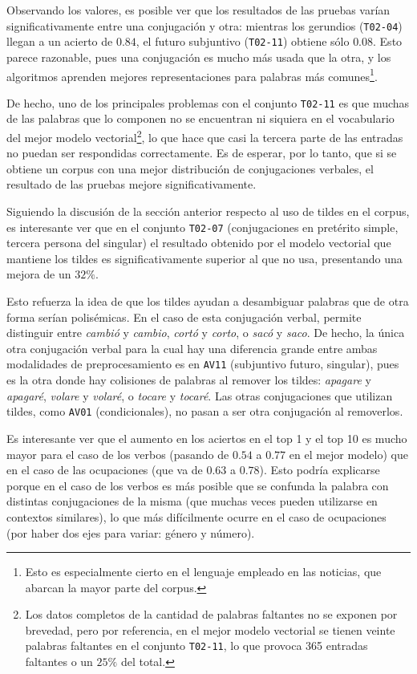 Observando los valores, es posible ver que los resultados de las pruebas varían significativamente
entre una conjugación y otra: mientras los gerundios (\texttt{T02-04}) llegan a un acierto de
$0.84$, el futuro subjuntivo (\texttt{T02-11}) obtiene sólo $0.08$. Esto parece razonable, pues una
conjugación es mucho más usada que la otra, y los algoritmos aprenden mejores representaciones para
palabras más comunes\footnote{Esto es especialmente cierto en el lenguaje empleado en las noticias,
que abarcan la mayor parte del corpus.}.

De hecho, uno de los principales problemas con el conjunto \texttt{T02-11} es que muchas de las
palabras que lo componen no se encuentran ni siquiera en el vocabulario del mejor modelo
vectorial\footnote{Los datos completos de la cantidad de palabras faltantes no se exponen por
brevedad, pero por referencia, en el mejor modelo vectorial se tienen veinte palabras faltantes en
el conjunto \texttt{T02-11}, lo que provoca 365 entradas faltantes o un $25\%$ del total.}, lo que
hace que casi la tercera parte de las entradas no puedan ser respondidas correctamente. Es de
esperar, por lo tanto, que si se obtiene un corpus con una mejor distribución de conjugaciones
verbales, el resultado de las pruebas mejore significativamente.

Siguiendo la discusión de la sección anterior respecto al uso de tildes en el corpus, es interesante
ver que en el conjunto \texttt{T02-07} (conjugaciones en pretérito simple, tercera persona del
singular) el resultado obtenido por el modelo vectorial que mantiene los tildes es
significativamente superior al que no usa, presentando una mejora de un $32\%$.

Esto refuerza la idea de que los tildes ayudan a desambiguar palabras que de otra forma serían
polisémicas. En el caso de esta conjugación verbal, permite distinguir entre \textit{cambió} y
\textit{cambio}, \textit{cortó} y \textit{corto}, o \textit{sacó} y \textit{saco}. De hecho, la
única otra conjugación verbal para la cual hay una diferencia grande entre ambas modalidades de
preprocesamiento es en \texttt{AV11} (subjuntivo futuro, singular), pues es la otra donde hay
colisiones de palabras al remover los tildes: \textit{apagare} y \textit{apagaré}, \textit{volare} y
\textit{volaré}, o \textit{tocare} y \textit{tocaré}. Las otras conjugaciones que utilizan tildes,
como \texttt{AV01} (condicionales), no pasan a ser otra conjugación al removerlos.

Es interesante ver que el aumento en los aciertos en el top 1 y el top 10 es mucho mayor para el
caso de los verbos (pasando de $0.54$ a $0.77$ en el mejor modelo) que en el caso de las ocupaciones
(que va de $0.63$ a $0.78$). Esto podría explicarse porque en el caso de los verbos es más posible
que se confunda la palabra con distintas conjugaciones de la misma (que muchas veces pueden
utilizarse en contextos similares), lo que más difícilmente ocurre en el caso de ocupaciones (por
haber dos ejes para variar: género y número).


